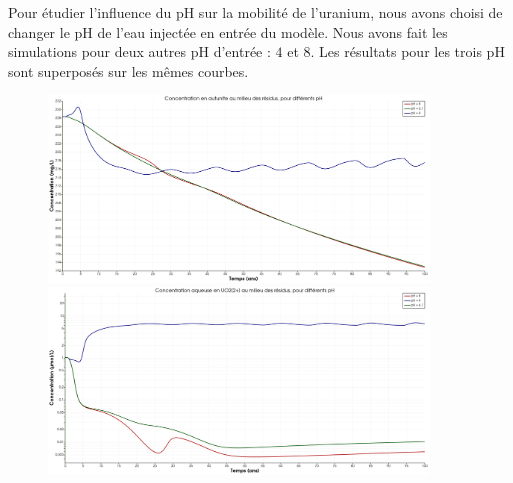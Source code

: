\documentclass{article}
\begin{document}
Pour étudier l’influence du pH sur la mobilité de l’uranium, nous avons choisi de changer le pH de l’eau injectée en entrée du modèle. Nous avons fait les simulations pour deux autres pH d’entrée : $4$ et $8$. Les résultats pour les trois pH sont superposés sur les mêmes courbes.

\begin{figure}[H]
    \centering
    \begin{minipage}{0.5\textwidth}
        \centering
        \includegraphics[width=0.9\textwidth]{III_B_2_9.png} 
        \caption{}
        \label{fig:autunite_residus_comparaison}
    \end{minipage}\hfill
    \begin{minipage}{0.5\textwidth}
        \centering
        \includegraphics[width=0.9\textwidth]{III_B_2_10.png} 
        \caption{}
        \label{fig:UO2_residus_comparaison}
    \end{minipage}
\end{figure}
\end{document}
